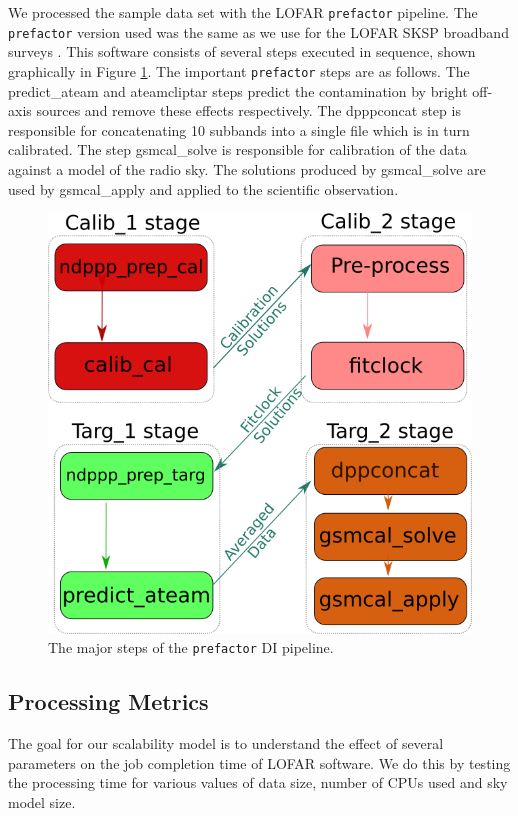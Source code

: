 We processed the sample data set with the LOFAR \texttt{prefactor} pipeline. The \texttt{prefactor} version used was the same as we use for the LOFAR SKSP broadband surveys \citep{prefactor_zenodo}. This software consists of several steps executed in sequence, shown graphically in Figure \ref{fig:prefactor_steps}. The important \texttt{prefactor} steps are as follows. The {\selectfont predict\_ateam} and {\selectfont ateamcliptar} steps predict the contamination by bright off-axis sources and remove these effects respectively. The {\selectfont dpppconcat} step is responsible for concatenating 10 subbands into a single file which is in turn calibrated. The step {\selectfont gsmcal\_solve} is responsible for calibration of the data against a model of the radio sky. The solutions produced by {\selectfont gsmcal\_solve} are used by {\selectfont gsmcal\_apply} and applied to the scientific observation.

\begin{figure}
    \includegraphics[width=0.95\linewidth]{figures/4_stages_steps1.png}
      \caption{The major steps of the \texttt{prefactor} DI pipeline. }
	\label{fig:prefactor_steps}
\end{figure}

\subsection{Processing Metrics}
The goal for our scalability model is to understand the effect of several parameters on the job completion time of LOFAR software. We do this by testing the processing time for various values of data size, number of CPUs used and sky model size. 
 

